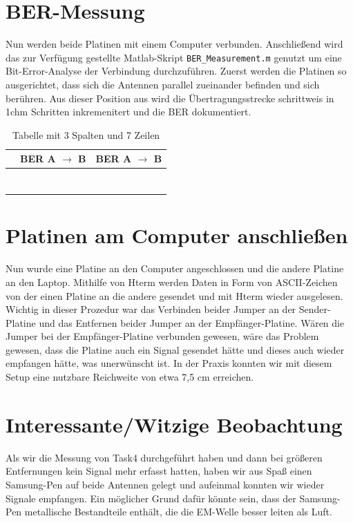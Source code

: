 \section{BER-Messung}
Nun werden beide Platinen mit einem Computer verbunden. Anschließend wird das zur Verfügung gestellte
Matlab-Skript \texttt{BER\_Measurement.m} genutzt um eine Bit-Error-Analyse der Verbindung durchzuführen.
Zuerst werden die Platinen so ausgerichtet, dass sich die Antennen parallel zueinander befinden und sich berühren.
Aus dieser Position aus wird die Übertragungsstrecke schrittweis in 1chm Schritten inkremenitert und die BER dokumentiert.

\begin{table}[h!]
    \centering
        \begin{tabular}{c|c|c}
             & BER A $\rightarrow$ B & BER A $\rightarrow$ B \\
            \hline
             &  &  \\
            \hline
             &  &  \\
            \hline
             &  &  \\
            \hline
             &  &  \\
            \hline
             &  &  \\
            \hline
             &  &  \\
            \hline
             &  &  \\
        \end{tabular}
        \caption{Tabelle mit 3 Spalten und 7 Zeilen}
    \end{table}
\section{Platinen am Computer anschließen}
Nun wurde eine Platine an den Computer angeschlossen und die andere Platine an den Laptop.
Mithilfe von Hterm werden Daten in Form von ASCII-Zeichen von der einen Platine an die andere gesendet
und mit Hterm wieder ausgelesen.
Wichtig in dieser Prozedur war das Verbinden beider Jumper an der Sender-Platine und das Entfernen beider
Jumper an der Empfänger-Platine. 
Wären die Jumper bei der Empfänger-Platine verbunden gewesen, wäre das Problem gewesen, dass die Platine auch 
ein Signal gesendet hätte und dieses auch wieder empfangen hätte, was unerwünscht ist.
In der Praxis konnten wir mit diesem Setup eine nutzbare Reichweite von etwa 7,5 cm erreichen.

\section{Interessante/Witzige Beobachtung}
Als wir die Messung von Task4 durchgeführt haben und dann bei größeren Entfernungen kein Signal mehr erfasst hatten,
haben wir aus Spaß einen Samsung-Pen auf beide Antennen gelegt und aufeinmal konnten wir wieder Signale empfangen.
Ein möglicher Grund dafür könnte sein, dass der Samsung-Pen metallische Bestandteile enthält,
die die EM-Welle besser leiten als Luft.


